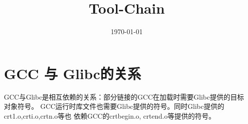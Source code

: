 \documentclass[11pt]{article}
\title{Tool-Chain}
\author{}
\date{\today}
\begin{document}
\maketitle

\setcounter{tocdepth}{3}
\tableofcontents
\vspace*{1cm}
\section{GCC 与 Glibc的关系}
\label{sec-1}

  GCC与Glibc是相互依赖的关系：部分链接的GCC在加载时需要Glibc提供的目标对象符号。
  GCC运行时库文件也需要Glibc提供的符号。同时Glibc提供的crt1.o,crti.o,crtn.o等也
  依赖GCC的crtbegin.o, crtend.o等提供的符号。
\end{document}
